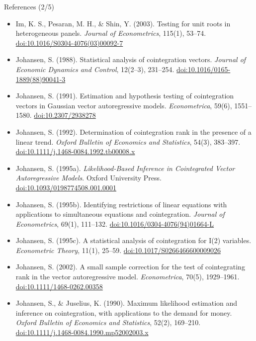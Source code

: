 \begin{frame}{References (2/5)}
\itemsize{\tiny}
\begin{itemize}
    \item Im, K. S., Pesaran, M. H., \& Shin, Y. (2003). Testing for unit roots in heterogeneous panels. \textit{Journal of Econometrics}, 115(1), 53--74. \href{https://doi.org/10.1016/S0304-4076(03)00092-7}{doi:10.1016/S0304-4076(03)00092-7}
    \item Johansen, S. (1988). Statistical analysis of cointegration vectors. \textit{Journal of Economic Dynamics and Control}, 12(2--3), 231--254. \href{https://doi.org/10.1016/0165-1889(88)90041-3}{doi:10.1016/0165-1889(88)90041-3}
    \item Johansen, S. (1991). Estimation and hypothesis testing of cointegration vectors in Gaussian vector autoregressive models. \textit{Econometrica}, 59(6), 1551--1580. \href{https://doi.org/10.2307/2938278}{doi:10.2307/2938278}
    \item Johansen, S. (1992). Determination of cointegration rank in the presence of a linear trend. \textit{Oxford Bulletin of Economics and Statistics}, 54(3), 383--397. \href{https://doi.org/10.1111/j.1468-0084.1992.tb00008.x}{doi:10.1111/j.1468-0084.1992.tb00008.x}
    \item Johansen, S. (1995a). \textit{Likelihood-Based Inference in Cointegrated Vector Autoregressive Models}. Oxford University Press. \href{https://doi.org/10.1093/0198774508.001.0001}{doi:10.1093/0198774508.001.0001}
    \item Johansen, S. (1995b). Identifying restrictions of linear equations with applications to simultaneous equations and cointegration. \textit{Journal of Econometrics}, 69(1), 111--132. \href{https://doi.org/10.1016/0304-4076(94)01664-L}{doi:10.1016/0304-4076(94)01664-L}
    \item Johansen, S. (1995c). A statistical analysis of cointegration for I(2) variables. \textit{Econometric Theory}, 11(1), 25--59. \href{https://doi.org/10.1017/S0266466600009026}{doi:10.1017/S0266466600009026}
    \item Johansen, S. (2002). A small sample correction for the test of cointegrating rank in the vector autoregressive model. \textit{Econometrica}, 70(5), 1929--1961. \href{https://doi.org/10.1111/1468-0262.00358}{doi:10.1111/1468-0262.00358}
    \item Johansen, S., \& Juselius, K. (1990). Maximum likelihood estimation and inference on cointegration, with applications to the demand for money. \textit{Oxford Bulletin of Economics and Statistics}, 52(2), 169--210. \href{https://doi.org/10.1111/j.1468-0084.1990.mp52002003.x}{doi:10.1111/j.1468-0084.1990.mp52002003.x}

\end{itemize}
\end{frame}
